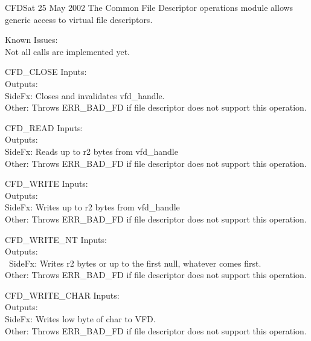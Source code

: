 \begin{scmodule}{CFD}{\perjsk}{\perjsk}{Sat 25 May 2002}
The Common File Descriptor operations module allows generic access to virtual
file descriptors.
\end{scmodule}
Known Issues:\\
Not all calls are implemented yet.
\begin{sccall}{CFD\_CLOSE}
Inputs: \\
Outputs: \scargs{}\\
SideFx: Closes and invalidates vfd\_handle.\\
Other: Throws ERR\_BAD\_FD if file descriptor does not support this operation.
\end{sccall}
\begin{sccall}{CFD\_READ}
Inputs: \\
Outputs: \\
SideFx: Reads up to r2 bytes from vfd\_handle\\
Other: Throws ERR\_BAD\_FD if file descriptor does not support this operation.
\end{sccall}
\begin{sccall}{CFD\_WRITE}
Inputs: \\
Outputs: \\
SideFx: Writes up to r2 bytes from vfd\_handle\\
Other: Throws ERR\_BAD\_FD if file descriptor does not support this operation.
\end{sccall}
\begin{sccall}{CFD\_WRITE\_NT}
Inputs: \\
Outputs: \\\
SideFx: Writes r2 bytes or up to the first null, whatever comes first.\\
Other: Throws ERR\_BAD\_FD if file descriptor does not support this operation.
\end{sccall}
\begin{sccall}{CFD\_WRITE\_CHAR}
Inputs: \\
Outputs: \scargs{}\\
SideFx: Writes low byte of char to VFD.\\
Other: Throws ERR\_BAD\_FD if file descriptor does not support this operation.
\end{sccall}
